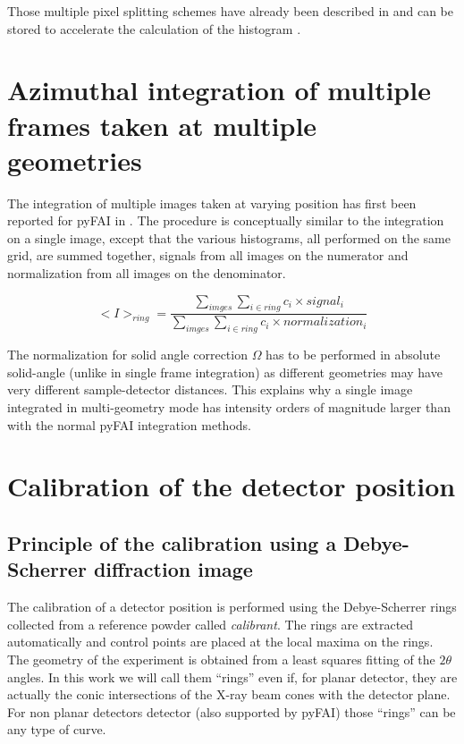 \documentclass[preprint]{iucr}              %
\begin{document}
Those multiple pixel splitting schemes have already been described in
 \cite{fv5028} and can be stored to accelerate the calculation of the
histogram  \cite{kieffer_ashiotis-proc-euroscipy-2014}.

\section{Azimuthal integration of multiple frames taken at multiple geometries}

The integration of multiple images taken at varying position has first been
reported for pyFAI in  \cite{PyFAI_PDJ}. 
The procedure is conceptually similar to the integration on a single image,
except that the various histograms, all performed on the same grid, are summed
together, signals from all images on the numerator and normalization from all
images on the denominator.

$$
<I>_{ring} = \frac{\sum\limits_{imges} \sum\limits_{i \in ring} c_i \times
signal_i} {\sum\limits_{imges} \sum\limits_{i \in ring} c_i \times
normalization_i} 
$$

The normalization for solid angle correction $\Omega$ has to be performed in
absolute solid-angle (unlike in single frame integration) as different
geometries may have very different sample-detector distances. 
This explains why a single image integrated in multi-geometry mode  has
intensity orders of magnitude larger than with the normal pyFAI integration
methods.

\section{Calibration of the detector position}

\subsection{Principle of the calibration using a Debye-Scherrer diffraction
image}
The calibration of a detector position is performed using the Debye-Scherrer
rings collected from a reference powder called \textit{calibrant}.
The rings are extracted automatically and control points are placed at the
local maxima on the rings.
The geometry of the experiment is obtained from a least squares fitting of
the $2\theta$ angles.
In this work we will call them ``rings'' even if, for planar detector,
they are actually the conic intersections of the X-ray beam cones
with the detector plane.
For non planar detectors detector (also supported by pyFAI) those ``rings'' can
be any type of curve.
\end{document}
